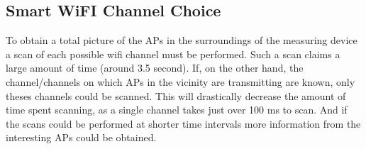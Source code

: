 \documentclass{LTHthesis}
\begin{document}
\subsection{Smart WiFI Channel Choice}
%
To obtain a total picture of the APs in the surroundings of the measuring device a scan of each possible wifi channel must be performed. Such a scan claims a large amount of time (around 3.5 second). If, on the other hand, the channel/channels on which APs in the vicinity are transmitting are known, only theses channels could be scanned. This will drastically decrease the amount of time spent scanning, as a single channel takes just over 100 ms to scan. And if the scans could be performed at shorter time intervals more information from the interesting APs could be obtained.   
%
\printbibliography  %
\end{document}
